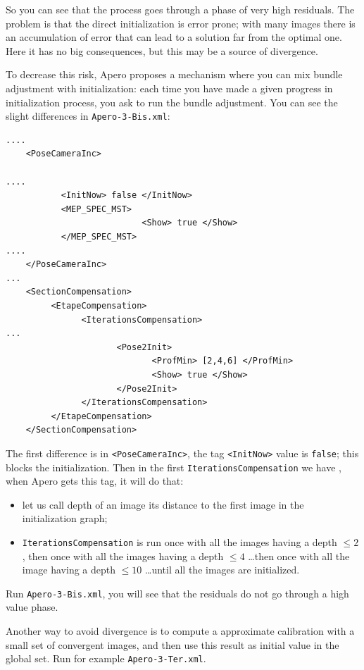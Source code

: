 So you can see that the process goes through a phase of very high 
residuals.  The problem is that the direct initialization 
is error prone; with many images there is an accumulation of error
that can lead to a solution far from the optimal one.
Here it has no big consequences, but this may be a
source of divergence. 

To decrease this risk, Apero proposes a mechanism where you can
mix bundle adjustment with initialization: each time you have
made a given progress in initialization process, you ask to run
the bundle adjustment. You can see the slight differences in {\tt  Apero-3-Bis.xml}:

{\scriptsize
\begin{verbatim}
....
    <PoseCameraInc>

....
           <InitNow> false </InitNow>
           <MEP_SPEC_MST>
                           <Show> true </Show>
           </MEP_SPEC_MST>
....
    </PoseCameraInc>
...
    <SectionCompensation>
         <EtapeCompensation>
               <IterationsCompensation>
...
                      <Pose2Init>
                             <ProfMin> [2,4,6] </ProfMin>
                             <Show> true </Show>
                      </Pose2Init>
               </IterationsCompensation>
         </EtapeCompensation>
    </SectionCompensation>
\end{verbatim}
}

The first difference is in {\tt  <PoseCameraInc>}, the tag 
{\tt <InitNow>} value is {\tt false}; this blocks the initialization.
Then in the first {\tt IterationsCompensation} we have {\tt <Pose2Init>},
when Apero gets this tag, it will do that:

\begin{itemize}
   \item   let us call  depth  of an image its distance to the first
           image in the initialization graph;

   \item   {\tt IterationsCompensation} is run once with all the images
           having a depth $\leq 2$, then once with all the images
           having a depth $\leq 4$ \dots then once with all the image
           having a depth $\leq 10$  \dots until all the images are
           initialized.
\end{itemize}

Run {\tt  Apero-3-Bis.xml}, you will see that the residuals do not
go through a high value phase. 


Another way to avoid divergence is to compute a approximate calibration
with a small set  of convergent images, and then use this result as
initial value in the global set.  Run for example {\tt Apero-3-Ter.xml}.





